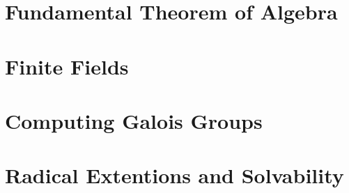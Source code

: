\documentclass[oneside]{book}
\theoremstyle{lemmastyle}
\theoremstyle{definitionstyle}
\theoremstyle{exercisestyle}
\theoremstyle{claimstyle}
\newcommand{\<}{\langle}
\renewcommand{\>}{\rangle}
\begin{document}
    \chapter{Fundamental Theorem of Algebra}
        
        
    \chapter{Finite Fields}
        
        
    \chapter{Computing Galois Groups}
        

    \chapter{Radical Extentions and Solvability}
        

    
\end{document}
